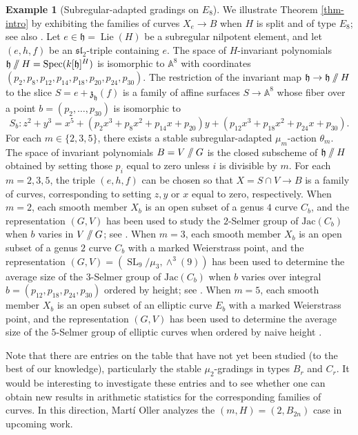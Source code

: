 \documentclass{article} %
\numberwithin{equation}{section}
\theoremstyle{definition}
\newtheorem{example}[proposition]{Example}
\DeclareMathOperator{\SL}{SL}
\DeclareMathOperator{\Lie}{Lie}
\DeclareMathOperator{\Spec}{Spec}
\newcommand{\A}{\mathbb{A}}
\newcommand{\GIT}{\mathbin{/\mkern-6mu/}}
\newcommand{\frakh}{\mathfrak h}
\newcommand{\frakz}{\mathfrak z}
\newcommand{\fraksl}{\mathfrak{sl}}
\newcommand{\rl}{r} %
\begin{document}
\begin{example}[Subregular-adapted gradings on $E_8$]
    We illustrate Theorem \ref{thm-intro} by exhibiting the families of curves $X_e\rightarrow B$ when $H$ is split and of type $E_8$; see also \cite[Section 6]{Romano-centralextensions}.
    Let $e\in \frakh = \Lie(H)$ be a subregular nilpotent element, and let $(e,h,f)$ be an $\fraksl_2$-triple containing $e$.
    The space of $H$-invariant polynomials $\frakh \GIT H = \Spec( k[\frakh]^H)$ is isomorphic to $\A^8$ with coordinates $(p_2, p_8, p_{12}, p_{14}, p_{18}, p_{20}, p_{24}, p_{30})$.
    The restriction of the invariant map $\frakh \rightarrow \frakh \GIT H$ to the slice $S = e + \frakz_{\frakh}(f)$ is a family of affine surfaces $S\rightarrow \A^8$ whose fiber over a point $b = (p_2, \dots,p_{30})$ is isomorphic to 
    \[
    S_b\colon z^2 + y^3 = x^5+ (p_2x^3+p_8x^2+p_{14}x+p_{20})y+(p_{12}x^3+p_{18}x^2+p_{24}x+p_{30}). 
    \]
    For each $m\in \{2,3,5\}$, there exists a stable subregular-adapted $\mu_m$-action $\theta_m$.
    The space of invariant polynomials $B = V\GIT G$ is the closed subscheme of $\frakh \GIT H$ obtained by setting those $p_i$ equal to zero unless $i$ is divisible by $m$.
    For each $m=2,3,5$, the triple $(e,h,f)$ can be chosen so that $X = S\cap V \rightarrow B$ is a family of curves, corresponding to setting $z,y$ or $x$ equal to zero, respectively. 
    When $m=2$, each smooth member $X_b$ is an open subset of a genus $4$ curve $C_b$, and the representation $(G,V)$ has been used to study the $2$-Selmer group of $\mathrm{Jac}(C_b)$ when $b$ varies in $V \GIT G$; see \cite{Thorne-thesis, Romano-Thorne-ArithmeticofsingularitiestypeE, Laga-ADEpaper}.
    When $m=3$, each smooth member $X_b$ is an open subset of a genus $2$ curve $C_b$ with a marked Weierstrass point, and the representation $(G,V) = (\SL_9/\mu_3, \wedge^3(9))$ has been used to determine the average size of the $3$-Selmer group of $\mathrm{Jac}(C_b)$ when $b$ varies over integral $b = (p_{12},p_{18},p_{24},p_{30})$ ordered by height; see \cite{Thorne-Romano-E8}.
    When $m = 5$, each smooth member $X_b$ is an open subset of an elliptic curve $E_b$ with a marked Weierstrass point, and the representation $(G,V)$ has been used to determine the average size of the $5$-Selmer group of elliptic curves when ordered by naive height \cite{BS-5Selmer}.
\end{example}

Note that there are entries on the table that have not yet been studied (to the best of our knowledge), particularly the stable $\mu_2$-gradings in types $B_\rl$ and $C_\rl$.  It would be interesting to investigate these entries 
and to see whether one can obtain new results in arithmetic statistics for the corresponding families of curves. In this direction, Martí Oller analyzes the $(m,H) = (2,B_{2n})$ case in upcoming work.
\end{document}
